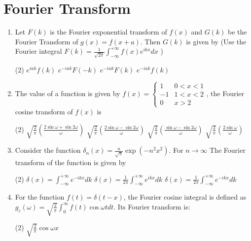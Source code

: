 \chapter{Fourier Transform}
\begin{enumerate}
	\item Let $F(k)$ is the Fourier exponential transform of $f(x)$ and $G(k)$ be the Fourier Transform of $g(x)=f(x+a)$. Then $G(k)$ is given by
	(Use the Fourier integral $F(k)=\frac{1}{\sqrt{2 \pi}} \int_{-\infty}^{+\infty} f(x) e^{i k x} d x$ )
	 \begin{tasks}(2)
		\task[\textbf{a.}]$e^{i a k} f(k)$
		\task[\textbf{b.}]$e^{-i a k} F(-k)$
		\task[\textbf{c.}] $e^{-i a k} F(k)$
		\task[\textbf{d.}] $e^{-i a k} f(k)$
	\end{tasks}
	\item The value of a function is given by $f(x)=\left\{\begin{array}{cc}1 & 0<x<1 \\ -1 & 1<x<2 \\ 0 & x>2\end{array}\right.$, the Fourier cosine transform of $f(x)$ is
	 \begin{tasks}(2)
		\task[\textbf{a.}]$\sqrt{\frac{2}{\pi}}\left(\frac{2 \sin \omega+\sin 2 \omega}{\omega}\right)$
		\task[\textbf{b.}]$\sqrt{\frac{2}{\pi}}\left(\frac{2 \sin \omega-\sin 2 \omega}{\omega}\right)$
		\task[\textbf{c.}]$\sqrt{\frac{2}{\pi}}\left(\frac{\sin \omega-\sin 2 \omega}{\omega}\right)$
		\task[\textbf{d.}] $\sqrt{\frac{2}{\pi}}\left(\frac{2 \sin \omega}{\omega}\right)$
	\end{tasks}
	\item Consider the function $\delta_{n}(x)=\frac{n}{\sqrt{\pi}} \exp \left(-n^{2} x^{2}\right)$. For $n \rightarrow \infty$ The Fourier transform of the function is given by
	 \begin{tasks}(2)
		\task[\textbf{a.}]$\delta(x)=\int_{-\infty}^{+\infty} e^{-i k x} d k$
		\task[\textbf{b.}]$\delta(x)=\frac{1}{2 \pi} \int_{-\infty}^{+\infty} e^{i k x} d k$
		\task[\textbf{c.}]$\delta(x)=\frac{1}{2 \pi} \int_{-\infty}^{+\infty} e^{-i k x} d k$
	\end{tasks}
	\item For the function $f(t)=\delta(t-x)$, the Fourier cosine integral is defined as $g_{c}(\omega)=\sqrt{\frac{2}{\pi}} \int_{0}^{\infty} f(t) \cos \omega t d t$. Its Fourier transform is:
	 \begin{tasks}(2)
		\task[\textbf{a.}] $\sqrt{\frac{2}{\pi}} \cos \omega x$

\end{tasks}
\end{enumerate}
